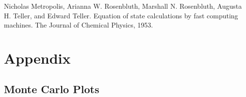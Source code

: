 \documentclass[12pt,a4paper,titlepage]{article}
\begin{document}
\newpage
\begin{thebibliography}{9}



Nicholas Metropolis, Arianna W. Rosenbluth, Marshall N. Rosenbluth, Augusta H. Teller, and Edward
Teller. Equation of state calculations by fast computing machines. The Journal of Chemical Physics, 1953.





\end{thebibliography}

\section{Appendix}
\begin{appendix}
	


\section*{Monte Carlo Plots}


\end{appendix}
\end{document}
